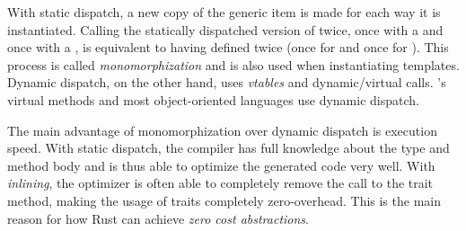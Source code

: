 With static dispatch, a new copy of the generic item is made for each way it is instantiated.
Calling the statically dispatched version of  twice, once with a  and once with a , is equivalent to having defined  twice (once for  and once for ).
This process is called \emph{monomorphization} and is also used when instantiating \cpp templates.
Dynamic dispatch, on the other hand, uses \emph{vtables} and dynamic/virtual calls.
\cpp's virtual methods and most object-oriented languages use dynamic dispatch.

The main advantage of monomorphization over dynamic dispatch is execution speed.
With static dispatch, the compiler has full knowledge about the type and method body and is thus able to optimize the generated code very well.
With \emph{inlining}, the optimizer is often able to completely remove the call to the trait method, making the usage of traits completely zero-overhead.
This is the main reason for how Rust can achieve \emph{zero cost abstractions}.

